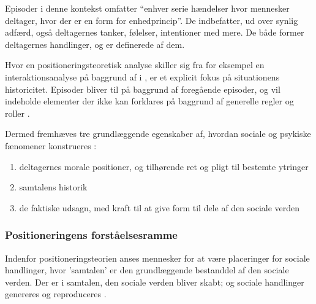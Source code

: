 Episoder i denne kontekst omfatter “enhver serie hændelser hvor 
mennesker deltager, hvor der er en form for enhedprincip”. De 
indbefatter, ud over synlig adfærd, også deltagernes tanker, 
følelser, intentioner med mere. De både former deltagernes 
handlinger, og er definerede af dem.

Hvor en positioneringsteoretisk analyse skiller sig fra for 
eksempel en interaktionsanalyse på baggrund af 
\citeauthor{goffmanPresentationSelfEveryday1956} i
, er et explicit 
fokus på situationens historicitet. Episoder bliver til på 
baggrund af foregående episoder, og vil indeholde elementer der 
ikke kan forklares på baggrund af generelle regler og roller 
\autocite[s. 5-6]{harrePositioningTheoryMoral1999}.

Dermed fremhæves tre grundlæggende egenskaber af, hvordan sociale 
og psykiske fænomener konstrueres 
\autocite{harrePositioningTheoryMoral1999}:
\begin{enumerate}
  \item
    deltagernes morale positioner, og tilhørende ret og pligt 
    til bestemte ytringer
  \item
    samtalens historik
  \item
    de faktiske udsagn, med kraft til at give form til dele af 
    den sociale verden
\end{enumerate}


\subsubsection{Positioneringens forståelsesramme}

Indenfor positioneringsteorien anses mennesker for at være 
placeringer for sociale handlinger, hvor 'samtalen' er den 
grundlæggende bestanddel af den sociale verden. Der er i samtalen,
den sociale verden bliver skabt; og sociale handlinger genereres 
og reproduceres \autocite[s. 
15]{harrePositioningTheoryMoral1999}.

